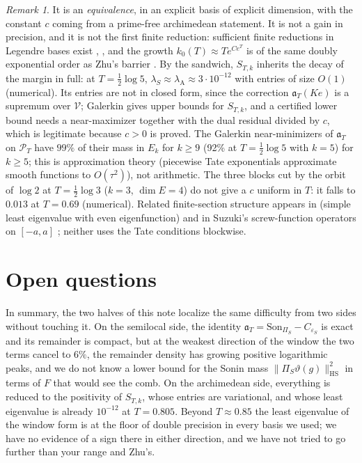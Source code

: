 \documentclass[11pt]{amsart}
\theoremstyle{definition}
\theoremstyle{remark}
\newtheorem{remark}[theorem]{Remark}
\newcommand{\PT}{\mathcal P_T}
\newcommand{\lamA}{\lambda_{\mathrm A}}
\newcommand{\Son}{\mathrm{Son}}
\begin{document}
\begin{remark}
It is an \emph{equivalence}, in an explicit basis of explicit dimension, with the constant $c$ coming from a prime-free
archimedean statement. It is not a gain in precision, and it is not the first finite reduction: sufficient finite reductions in
Legendre bases exist \cite[Thm.~1.1]{Zhu2026}, \cite{Groskin2026}, and the growth $k_0(T)\approx Te^{Ce^T}$ is of the same
doubly exponential order as Zhu's barrier \cite[Thm.~1.4]{Zhu2026}. By the sandwich, $S_{T,k}$ inherits the decay of the margin
in full: at $T=\frac12\log5$, $\lambda_S\approx\lamA\approx3\cdot10^{-12}$ with entries of size $O(1)$ (numerical). Its entries
are not in closed form, since the correction $\mathfrak a_T(Ke)$ is a supremum over $\mathcal V$; Galerkin gives upper bounds for
$S_{T,k}$, and a certified lower bound needs a near-maximizer together with the dual residual divided by $c$, which is
legitimate because $c>0$ is proved. The Galerkin near-minimizers of $\mathfrak a_T$ on $\PT$ have $99\%$ of their mass in $E_k$ for $k\ge9$ (92\% at $T=\frac12\log5$ with $k=5$)
for $k\ge5$; this is approximation theory (piecewise Tate exponentials approximate smooth functions to $O(\tau^2)$), not
arithmetic. The three blocks cut by the orbit of $\log2$ at $T=\frac12\log3$ ($k=3$, $\dim E=4$) do not give a $c$ uniform in $T$: it falls to $0.013$ at
$T=0.69$ (numerical). Related finite-section structure appears in \cite{CvS2025} (simple least eigenvalue with even
eigenfunction) and in Suzuki's screw-function operators on $[-a,a]$ \cite{Suzuki2023,Suzuki2026}; neither uses the Tate
conditions blockwise.
\end{remark}

\section{Open questions}\label{sec:open}

In summary, the two halves of this note localize the same difficulty from two sides without touching it.
On the semilocal side, the identity $\mathfrak a_T=\Son_{\Pi_S}-C_{\varepsilon_S}$ is exact and its remainder is compact, but at the
weakest direction of the window the two terms cancel to $6\%$, the remainder density has growing positive logarithmic peaks,
and we do not know a lower bound for the Sonin mass $\|\Pi_S\vartheta(g)\|^2_{\mathrm{HS}}$ in terms of $F$ that would see the
comb. On the archimedean side, everything is reduced to the positivity of $S_{T,k}$, whose entries are variational, and whose
least eigenvalue is already $10^{-12}$ at $T=0.805$. Beyond $T\approx0.85$ the least eigenvalue of the window form is at the
floor of double precision in every basis we used; we have no evidence of a sign there in either direction, and we have not tried
to go further than your range and Zhu's.
\end{document}
